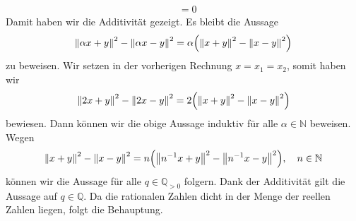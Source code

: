 \documentclass[german,12pt]{homework}
\newcommand{\NN}{\mathbb{N}}
\newcommand{\QQ}{\mathbb{Q}}
\DeclarePairedDelimiter{\norm}{\lVert}{\rVert}
\DeclarePairedDelimiter{\enbrace}{(}{)}
\begin{document}
\begin{enumerate}
\begin{align*}
            &= 0
        \end{align*}
        Damit haben wir die Additivität gezeigt. Es bleibt die Aussage
        \[\norm*{\alpha{x} + y}^2 - \norm*{\alpha{x} - y}^2 = \alpha\enbrace*{\norm*{x + y}^2 - \norm*{x - y}^2}\]
        zu beweisen. Wir setzen in der vorherigen Rechnung \(x = x_1 = x_2\), somit haben wir
        \[\norm*{2x + y}^2 - \norm*{2x - y}^2 = 2\enbrace*{\norm*{x + y}^2 - \norm*{x - y}^2}\]
        bewiesen. Dann können wir die obige Aussage induktiv für alle \(\alpha \in \NN\) beweisen. Wegen
        \[\norm*{x + y}^2 - \norm*{x - y}^2 = n\enbrace*{\norm*{n^{-1}x + y}^2 - \norm*{n^{-1}x - y}^2}, \quad n \in \NN\]
        können wir die Aussage für alle \(q \in \QQ_{> 0}\) folgern. Dank der Additivität gilt die Aussage auf \(q \in \QQ\). Da die rationalen Zahlen dicht in der Menge der reellen Zahlen liegen, folgt die Behauptung.
    \end{enumerate}
\end{document}
